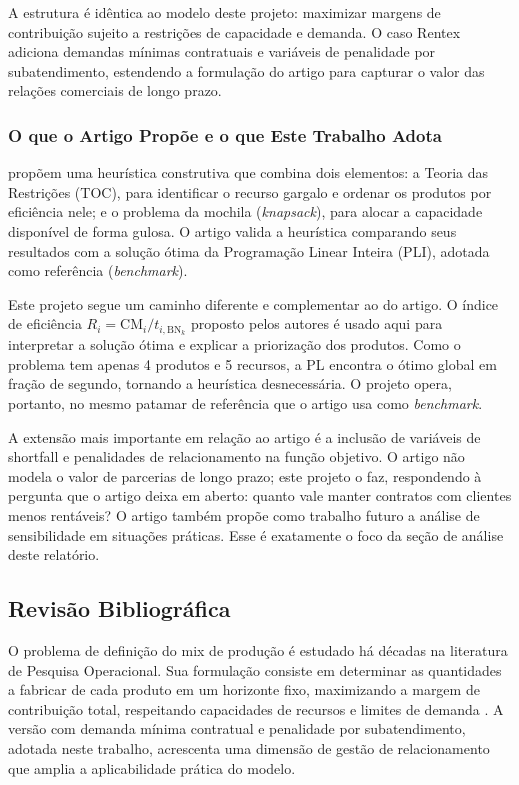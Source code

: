 A estrutura é idêntica ao modelo deste projeto: maximizar margens de contribuição
sujeito a restrições de capacidade e demanda. O caso Rentex adiciona demandas
mínimas contratuais e variáveis de penalidade por subatendimento, estendendo
a formulação do artigo para capturar o valor das relações comerciais de longo prazo.

\subsubsection{O que o Artigo Propõe e o que Este Trabalho Adota}

\textcite{sobreiro2013} propõem uma heurística construtiva que combina dois
elementos: a Teoria das Restrições (TOC), para identificar o recurso gargalo
e ordenar os produtos por eficiência nele; e o problema da mochila
(\textit{knapsack}), para alocar a capacidade disponível de forma gulosa. O
artigo valida a heurística comparando seus resultados com a solução ótima da
Programação Linear Inteira (PLI), adotada como referência (\textit{benchmark}).

Este projeto segue um caminho diferente e complementar ao do artigo. O índice
de eficiência $R_i = \mathrm{CM}_i / t_{i,\mathrm{BN}_k}$ proposto pelos autores
é usado aqui para interpretar a solução ótima e explicar a priorização dos
produtos. Como o problema tem apenas 4 produtos e 5 recursos, a PL encontra
o ótimo global em fração de segundo, tornando a heurística desnecessária. O
projeto opera, portanto, no mesmo patamar de referência que o artigo usa como
\textit{benchmark}.

A extensão mais importante em relação ao artigo é a inclusão de variáveis de
shortfall e penalidades de relacionamento na função objetivo. O artigo não
modela o valor de parcerias de longo prazo; este projeto o faz, respondendo à
pergunta que o artigo deixa em aberto: quanto vale manter contratos com clientes
menos rentáveis? O artigo também propõe como trabalho futuro a análise de
sensibilidade em situações práticas. Esse é exatamente o foco da seção de
análise deste relatório.

\newpage

\subsection{Revisão Bibliográfica}

O problema de definição do mix de produção é estudado há décadas na literatura
de Pesquisa Operacional. Sua formulação consiste em determinar as quantidades a
fabricar de cada produto em um horizonte fixo, maximizando a margem de
contribuição total, respeitando capacidades de recursos e limites de demanda
\cite{hillier2006, arenales2007}. A versão com demanda mínima contratual e
penalidade por subatendimento, adotada neste trabalho, acrescenta uma dimensão
de gestão de relacionamento que amplia a aplicabilidade prática do modelo.

